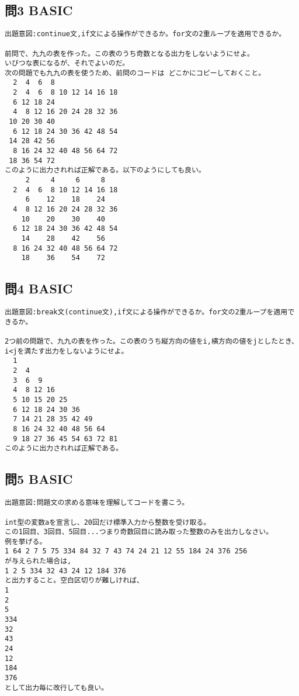 \documentclass[a4j,titlepage,dvipdfmx]{jsarticle}   %
\begin{document}
\subsection{問3 BASIC}
\begin{verbatim}
出題意図:continue文,if文による操作ができるか。for文の2重ループを適用できるか。

前問で、九九の表を作った。この表のうち奇数となる出力をしないようにせよ。
いびつな表になるが、それでよいのだ。
次の問題でも九九の表を使うため、前問のコードは	どこかにコピーしておくこと。
  2  4  6  8
  2  4  6  8 10 12 14 16 18
  6 12 18 24
  4  8 12 16 20 24 28 32 36
 10 20 30 40
  6 12 18 24 30 36 42 48 54
 14 28 42 56
  8 16 24 32 40 48 56 64 72
 18 36 54 72
このように出力されれば正解である。以下のようにしても良い。
     2     4     6     8
  2  4  6  8 10 12 14 16 18
     6    12    18    24
  4  8 12 16 20 24 28 32 36
    10    20    30    40
  6 12 18 24 30 36 42 48 54
    14    28    42    56
  8 16 24 32 40 48 56 64 72
    18    36    54    72
\end{verbatim}

\subsection{問4 BASIC}
\begin{verbatim}
出題意図:break文(continue文),if文による操作ができるか。for文の2重ループを適用できるか。

2つ前の問題で、九九の表を作った。この表のうち縦方向の値をi,横方向の値をjとしたとき、i<jを満たす出力をしないようにせよ。
  1
  2  4
  3  6  9
  4  8 12 16
  5 10 15 20 25
  6 12 18 24 30 36
  7 14 21 28 35 42 49
  8 16 24 32 40 48 56 64
  9 18 27 36 45 54 63 72 81
このように出力されれば正解である。
\end{verbatim}

\subsection{問5 BASIC}
\begin{verbatim}
出題意図:問題文の求める意味を理解してコードを書こう。

int型の変数aを宣言し、20回だけ標準入力から整数を受け取る。
この1回目、3回目、5回目...つまり奇数回目に読み取った整数のみを出力しなさい。
例を挙げる。
1 64 2 7 5 75 334 84 32 7 43 74 24 21 12 55 184 24 376 256
が与えられた場合は,
1 2 5 334 32 43 24 12 184 376
と出力すること。空白区切りが難しければ、
1
2
5
334
32
43
24
12
184
376
として出力毎に改行しても良い。
\end{verbatim}
\end{document}
